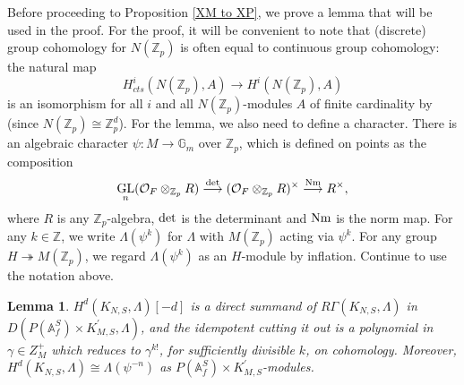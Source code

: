 \documentclass{amsart}
\newtheorem{lemma}[subsubsection]{Lemma}
\theoremstyle{remark}
\numberwithin{equation}{subsection}
\newcommand{\A}{\AA}
\newcommand{\Z}{\ZZ}
\renewcommand{\AA}{{\mathbb A}}
\newcommand{\GG}{{\mathbb G}}
\newcommand{\ZZ}{{\mathbb Z}}
\newcommand{\cO}{{\mathcal O}}
\newcommand{\Zp}{\Z_p}
\DeclareMathOperator{\GL}{GL}
\renewcommand{\(}{\left(}
\renewcommand{\)}{\right)}
\begin{document}
\medskip

Before proceeding to Proposition \ref{XM to XP}, we prove a lemma that will be used in the proof. For the proof, it will be convenient to note that (discrete) group cohomology for $N(\Zp)$ is often equal to continuous group cohomology: the natural map
\[
 H_{cts}^{i}(N(\Zp),A) \to H^{i}(N(\Zp),A) 
\]
is an isomorphism for all $i$ and all $N(\Zp)$-modules $A$ of finite cardinality by \cite[Theorem 2.10]{fkrs} (since $N(\Zp)\cong \Zp^{d}$). For the lemma, we also need to define a character. There is an algebraic character $\psi \colon M \to \GG_m$ over $\Zp$, which is defined on points as the composition
\[
 \GL_{n}(\cO_{F} \otimes_{\Zp} R) \overset{{\rm det}}{\longrightarrow} (\cO_{F} \otimes_{\Zp}R)^{\times} \overset{{\rm Nm}}{\longrightarrow} R^{\times},
\]
where $R$ is any $\Zp$-algebra, ${\rm det}$ is the determinant and ${\rm Nm}$ is the norm map. For any $k\in \Z$, we write $\Lambda(\psi^k)$ for $\Lambda$ with $M(\Zp)$ acting via $\psi^k$. For any group $H \twoheadrightarrow M(\Zp)$, we regard $\Lambda(\psi^k)$ as an $H$-module by inflation. Continue to use the notation above.

\begin{lemma}\label{splitting off the top degree} $H^d(K_{N,S}, \Lambda)[-d]$ is a direct summand of $R\Gamma(K_{N,S},\Lambda)$ in $D(P(\A_f^S)\times K_{M,S}^\prime, \Lambda)$, and the idempotent cutting it out is a polynomial in $\gamma \in Z_M^+$ which reduces to $\gamma^{k!}$, for sufficiently divisible $k$, on cohomology. Moreover, $H^d(K_{N,S}, \Lambda)\cong \Lambda(\psi^{-n})$ as $P(\A_f^S) \times K_{M,S}^\prime$-modules.
\end{lemma}
\end{document}
